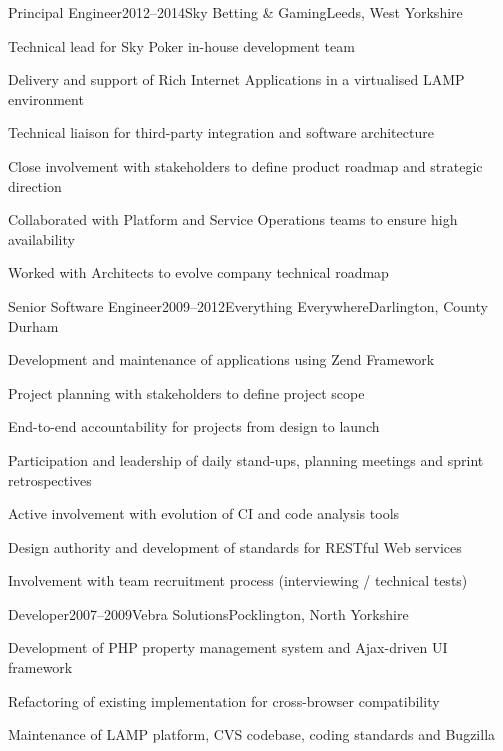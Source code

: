 \documentclass{cv}
\begin{document}

\begin{experience}{Principal Engineer}{2012--2014}{Sky Betting \& Gaming}{Leeds, West Yorkshire}
\item Technical lead for Sky Poker in-house development team
\item Delivery and support of Rich Internet Applications in a virtualised LAMP environment
\item Technical liaison for third-party integration and software architecture
\item Close involvement with stakeholders to define product roadmap and strategic direction
\item Collaborated with Platform and Service Operations teams to ensure high availability
\item Worked with Architects to evolve company technical roadmap
\end{experience}


\begin{experience}{Senior Software Engineer}{2009--2012}{Everything Everywhere}{Darlington, County Durham}
\item Development and maintenance of applications using Zend Framework
\item Project planning with stakeholders to define project scope
\item End-to-end accountability for projects from design to launch
\item Participation and leadership of daily stand-ups, planning meetings and sprint retrospectives
\item Active involvement with evolution of CI and code analysis tools
\item Design authority and development of standards for RESTful Web services
\item Involvement with team recruitment process (interviewing / technical tests)
\end{experience}


\begin{experience}{Developer}{2007--2009}{Vebra Solutions}{Pocklington, North Yorkshire}
\item Development of PHP property management system and Ajax-driven UI framework
\item Refactoring of existing implementation for cross-browser compatibility
\item Maintenance of LAMP platform, CVS codebase, coding standards and Bugzilla
\end{experience}
\end{document}
